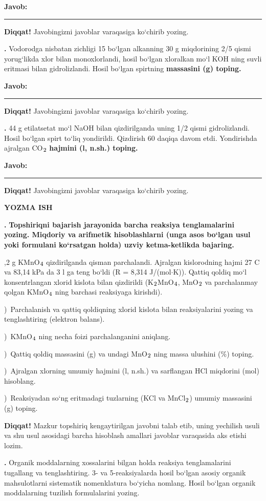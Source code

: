 \documentclass[11pt,a4paper]{article}
\renewcommand{\textsubscript}[1]{\ensuremath{_{\text{\fontsize{8}{8}\selectfont #1}}}}
\newcommand{\qn}[1]{\textbf{\fontsize{11.5}{13}\selectfont #1}}
\newcommand{\qsep}{\par\vspace{13pt}}
\newcommand{\diqqat}[1]{\par\smallskip\noindent\textbf{Diqqat!} #1\par\medskip}
\newcommand{\javob}{\par\nopagebreak[4]\smallskip\noindent\textbf{Javob:} \rule[-2pt]{7.5cm}{0.4pt}\par\smallskip\noindent\textbf{Diqqat!} Javobingizni javoblar varaqasiga ko`chirib yozing.\par\medskip}
\begin{document}
\javob\qsep
\noindent\qn{39.} Vodorodga nisbatan zichligi 15 bo`lgan alkanning 30 g miqdorining 2/5 qismi yorug`likda xlor bilan monoxlorlandi, hosil bo`lgan xloralkan mo`l KOH ning suvli eritmasi bilan gidrolizlandi. Hosil bo`lgan spirtning \textbf{massasini (g) toping.}
\javob\qsep
\noindent\qn{40.} 44 g etilatsetat mo`l NaOH bilan qizdirilganda uning 1/2 qismi gidrolizlandi. Hosil bo`lgan spirt to`liq yondirildi. Qizdirish 60 daqiqa davom etdi. Yondirishda ajralgan CO\textsubscript{2} \textbf{hajmini (l, n.sh.) toping.}
\javob\qsep
\par\bigskip\begin{center}\textbf{\fontsize{13}{15}\selectfont YOZMA ISH}\end{center}
\noindent\qn{41.} \textbf{Topshiriqni bajarish jarayonida barcha reaksiya tenglamalarini yozing. Miqdoriy va arifmetik hisoblashlarni (unga asos bo`lgan usul yoki formulani ko`rsatgan holda) uzviy ketma-ketlikda bajaring.}\par{},2 g KMnO\textsubscript{4} qizdirilganda qisman parchalandi. Ajralgan kislorodning hajmi 27 \textdegree{}C va 83,14 kPa da 3 l ga teng bo`ldi (R = 8,314 J/(mol$\cdot$K)). Qattiq qoldiq mo`l konsentrlangan xlorid kislota bilan qizdirildi (K\textsubscript{2}MnO\textsubscript{4}, MnO\textsubscript{2} va parchalanmay qolgan KMnO\textsubscript{4} ning barchasi reaksiyaga kirishdi).\par
{})\ Parchalanish va qattiq qoldiqning xlorid kislota bilan reaksiyalarini yozing va tenglashtiring (elektron balans).\par
{})\ KMnO\textsubscript{4} ning necha foizi parchalanganini aniqlang.\par
{})\ Qattiq qoldiq massasini (g) va undagi MnO\textsubscript{2} ning massa ulushini (\%) toping.\par
{})\ Ajralgan xlorning umumiy hajmini (l, n.sh.) va sarflangan HCl miqdorini (mol) hisoblang.\par
{})\ Reaksiyadan so`ng eritmadagi tuzlarning (KCl va MnCl\textsubscript{2}) umumiy massasini (g) toping.\par
\diqqat{Mazkur topshiriq kengaytirilgan javobni talab etib, uning yechilish usuli va shu usul asosidagi barcha hisoblash amallari javoblar varaqasida aks etishi lozim.}\qsep
\noindent\qn{42.} Organik moddalarning xossalarini bilgan holda reaksiya tenglamalarini tugallang va tenglashtiring. 3- va 5-reaksiyalarda hosil bo`lgan asosiy organik mahsulotlarni sistematik nomenklatura bo`yicha nomlang. Hosil bo`lgan organik moddalarning tuzilish formulalarini yozing.\par
\end{document}
